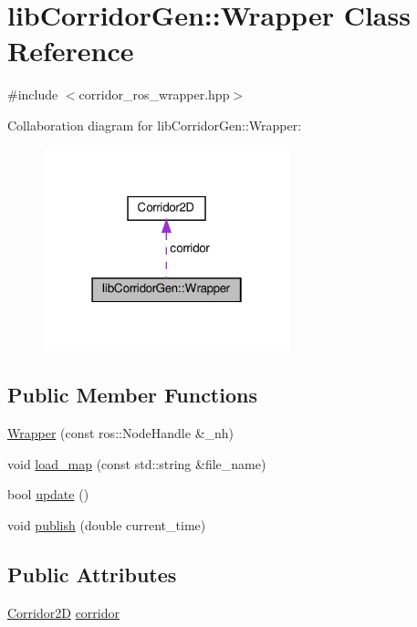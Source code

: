\hypertarget{classlib_corridor_gen_1_1_wrapper}{}\section{lib\+Corridor\+Gen\+:\+:Wrapper Class Reference}
\label{classlib_corridor_gen_1_1_wrapper}


{\ttfamily \#include $<$corridor\+\_\+ros\+\_\+wrapper.\+hpp$>$}



Collaboration diagram for lib\+Corridor\+Gen\+:\+:Wrapper\+:
\nopagebreak
\begin{figure}[H]
\begin{center}
\leavevmode
\includegraphics[width=202pt]{classlib_corridor_gen_1_1_wrapper__coll__graph}
\end{center}
\end{figure}
\subsection*{Public Member Functions}
\begin{DoxyCompactItemize}
\item 
\hyperlink{classlib_corridor_gen_1_1_wrapper_a7f63deeaa58e21123fa14eedb000d7e1}{Wrapper} (const ros\+::\+Node\+Handle \&\+\_\+nh)
\item 
void \hyperlink{classlib_corridor_gen_1_1_wrapper_a8e09f2a4a14001ae5c7f34adbc813402}{load\+\_\+map} (const std\+::string \&file\+\_\+name)
\item 
bool \hyperlink{classlib_corridor_gen_1_1_wrapper_acd9549de373235c2252dd47e7ccae5e4}{update} ()
\item 
void \hyperlink{classlib_corridor_gen_1_1_wrapper_af245b12ced576cd5623c399eb1ba84c1}{publish} (double current\+\_\+time)
\end{DoxyCompactItemize}
\subsection*{Public Attributes}
\begin{DoxyCompactItemize}
\item 
\hyperlink{struct_corridor2_d}{Corridor2D} \hyperlink{classlib_corridor_gen_1_1_wrapper_a5f842d988a9f607bde2493d1c9d09e91}{corridor}
\end{DoxyCompactItemize}


